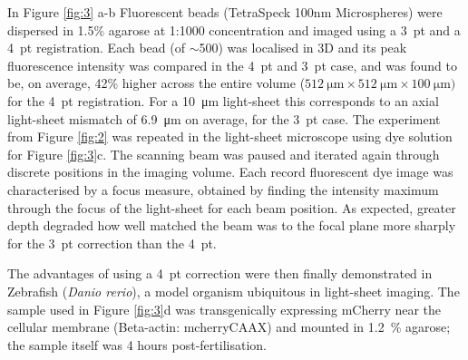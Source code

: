 In Figure \ref{fig:3} a-b Fluorescent beads (TetraSpeck 100nm Microspheres) were dispersed in 1.5\% agarose at 1:1000 concentration and imaged using a 3~pt and a 4~pt registration.
Each bead (of $\sim$500) was localised in 3D %
and its peak fluorescence intensity was compared in the 4~pt and 3~pt case, and was found to be, on average,
42\% higher across the entire volume ($512~\si{\micro\metre} \times 512~\si{\micro\metre}\times 100~\si{\micro\metre}) $ for the 4~pt registration.
For a 10~\si{\micro\metre} light-sheet this corresponds to an axial light-sheet mismatch of 6.9~\si{\micro\metre} on average, for the 3~pt case. %
The experiment from Figure \ref{fig:2} was repeated in the light-sheet microscope using dye solution for Figure \ref{fig:3}c.
The scanning beam was paused and iterated again through discrete positions in the imaging volume.
Each record fluorescent dye image was characterised by a focus measure, obtained by finding the intensity maximum through the focus of the light-sheet for each beam position.
As expected, greater depth degraded how well matched the beam was to the focal plane more sharply for the 3~pt correction than the 4~pt.

The advantages of using a 4~pt correction were then finally demonstrated in Zebrafish (\emph{Danio rerio}), a model organism  ubiquitous in light-sheet imaging.
The sample used in Figure \ref{fig:3}d was transgenically expressing mCherry near the cellular membrane (Beta-actin: mcherryCAAX) and mounted in 1.2~\% agarose;
the sample itself was 4 hours post-fertilisation.

